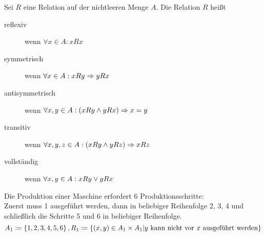 \begin{definition}
Sei $R$ eine Relation auf der nichtleeren Menge $A$. Die Relation $R$ heißt
\begin{description}
\item[reflexiv] wenn $\forall x \in A : xRx$
\item[symmetrisch] wenn $\forall x \in A: xRy \Rightarrow yRx$
\item[antisymmetrisch] wenn $\forall x, y \in A: \left(xRy \wedge yRx\right) \Rightarrow x = y$
\item[transitiv] wenn $\forall x, y, z \in A: \left(xRy \wedge yRz\right) \Rightarrow xRz$
\item[vollständig] wenn $\forall x, y \in A: xRy \vee yRx$
\end{description}
\end{definition}

\begin{example}
Die Produktion einer Maschine erfordert 6 Produktionsschritte:\\
Zuerst muss 1 ausgeführt werden, dann in beliebiger Reihenfolge 2, 3, 4 und schließlich die Schritte 5 und 6 in beliebiger Reihenfolge.
\[A_1 \mathrel{\mathop:\!\!=} \left\{1, 2, 3, 4, 5, 6\right\}, R_1 \mathrel{\mathop:\!\!=} \left\{\left(x,y\right) \in A_1 \times A_1 \vert y \text{ kann nicht vor } x \text{ ausgeführt werden}\right\}\]
\end{example}